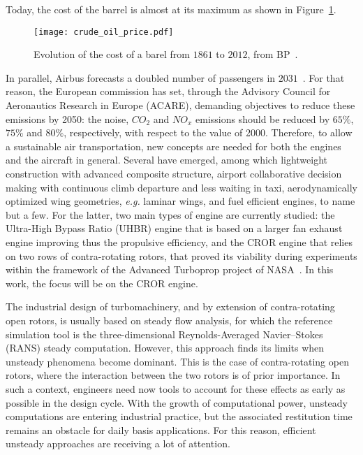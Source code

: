 Today, the cost of the barrel is almost at its maximum as shown
in Figure~\ref{fig:crude_oil_price}.
\begin{figure}[htp]
  \centering
  \texttt{[image: crude\_oil\_price.pdf]}
  \caption{Evolution of the cost of a barel from $1861$ to $2012$, from BP~\cite{bpreview2013}.}
  \label{fig:crude_oil_price}
\end{figure}
In parallel, Airbus forecasts a doubled number of passengers in
$2031$~\cite{AirbusForecast2013}. For that reason, the European commission has set, through the
Advisory Council for Aeronautics Research in Europe (ACARE),
demanding objectives to reduce these emissions by 2050:
the noise, $CO_2$ and $NO_x$ emissions should be reduced by 
$65\%$, $75\%$ and $80\%$, respectively, with respect to
the value of 2000.
Therefore, to allow a sustainable air transportation, new
concepts are needed for both the engines and the 
aircraft in general.
Several have emerged, among which lightweight construction
with advanced composite structure, airport collaborative decision
making with continuous climb departure and less waiting in taxi,
aerodynamically optimized wing geometries, \emph{e.g.} laminar wings,
and fuel efficient engines, to name but a few.
For the latter, two main types of engine are currently studied: the
Ultra-High Bypass Ratio (UHBR) engine that is based on a
larger fan exhaust engine improving thus the
propulsive efficiency, and the CROR
engine that relies on two rows of contra-rotating rotors,
that proved its viability during experiments within the framework of
the Advanced Turboprop project of NASA~\cite{Hager1988}.
In this work, the focus will be on the CROR engine.
\newline 

The industrial design of turbomachinery, and by extension of contra-rotating
open rotors, is usually based on steady flow analysis, 
for which the reference simulation tool is the three-dimensio\-nal Reynolds-Averaged 
Navier--Stokes (RANS) steady computation. However, this approach finds its limits 
when unsteady phenomena become dominant. This is the case of 
contra-rotating open rotors, where the interaction between the
two rotors is of prior importance. 
In such a
context, engineers need now tools to account for these effects as
early as possible in the design cycle. With the growth of
computational power, unsteady computations are entering industrial
practice, but the associated restitution time remains an obstacle for
daily basis applications.  For this reason, efficient
unsteady approaches are receiving a lot of attention. 

